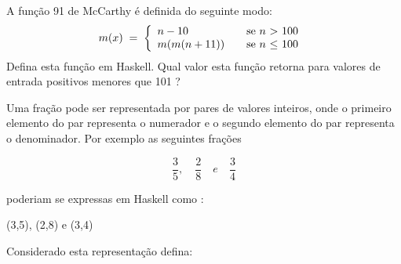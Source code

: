 \documentclass[a4paper,11pt]{exam}
\begin{document}
\begin{questions}
   
  
  \question  A função 91 de McCarthy é definida do seguinte modo:
  \[ 
    m(x)\; = \; \left\{
    \begin{array}{l l}
        n-10 \quad & \text{se $n$ $>$ 100}\\
        m(m(n+11)) \quad & \text{se $n$ $\leq$ 100 }\\
    \end{array} \right.
  \]
  Defina esta função em Haskell. Qual valor esta função retorna para valores de entrada positivos menores que 101 ?
  
  
  \question  Uma fração pode ser representada por pares de valores inteiros, onde o primeiro elemento do par representa
  o numerador e o segundo elemento do par representa o denominador. Por exemplo as seguintes frações
  \begin{center}
     \[\displaystyle \frac{3}{5},\quad  \frac{2}{8} \quad e \quad \frac{3}{4} \]
  \end{center}
  poderiam se expressas em Haskell como :
  \begin{center}
     (3,5), (2,8) e (3,4)
  \end{center}
  Considerado esta representação defina: 
\end{questions}
\end{document}
